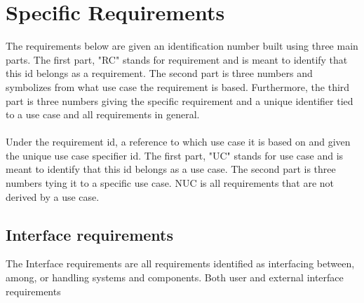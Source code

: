 \section{Specific Requirements}
The requirements below are given an identification number built using three main parts. The first part, "RC" stands for requirement and is meant to identify that this id belongs as a requirement. The second part is three numbers and symbolizes from what use case the requirement is based. Furthermore, the third part is three numbers giving the specific requirement and a unique identifier tied to a use case and all requirements in general.
\\\\
Under the requirement id, a reference to which use case it is based on and given the unique use case specifier id. The first part, "UC" stands for use case and is meant to identify that this id belongs as a use case. The second part is three numbers tying it to a specific use case. NUC is all requirements that are not derived by a use case.
\label{sec:specificrequirements}
\subsection{Interface requirements}
The Interface requirements are all requirements identified as interfacing between, among, or handling systems and components. Both user and external interface requirements
